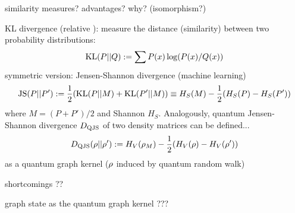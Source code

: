 similarity measures? advantages? why? (isomorphism?)
\begin{definition}[divergence]\label{def:divergence}
	KL divergence (relative ): measure the distance (similarity) between two probability distributions:
	\begin{equation}
		\text{KL} (P || Q) := \sum P(x) \log (P(x)/Q(x))
	\end{equation}
	symmetric version: Jensen-Shannon divergence (machine learning)
	\begin{equation}
		\text{JS} (P || P') := \frac{1}{2} \qty(\text{KL}(P|| M) + \text{KL}(P'||M))
		\equiv H_S(M)-\frac{1}{2} (H_S(P) - H_S(P') ) 
	\end{equation}
	where $M=(P+P')/2$ and Shannon  $H_S$.
	Analogously, quantum Jensen-Shannon divergence $D_{\text{QJS}}$ of two density matrices can be defined...
	\begin{equation}
		D_{\text{QJS}}(\rho||\rho'):= 
		H_V(\rho_M) - \frac{1}{2} (H_V(\rho) - H_V(\rho') ) 
	\end{equation}
	as a quantum graph kernel ($\rho$ induced by quantum random walk)
\end{definition}
\begin{remark}
	\psd
\end{remark}
shortcomings ??
\begin{definition}\label{def:graph_state}
\end{definition}
graph state as the quantum graph kernel ???


